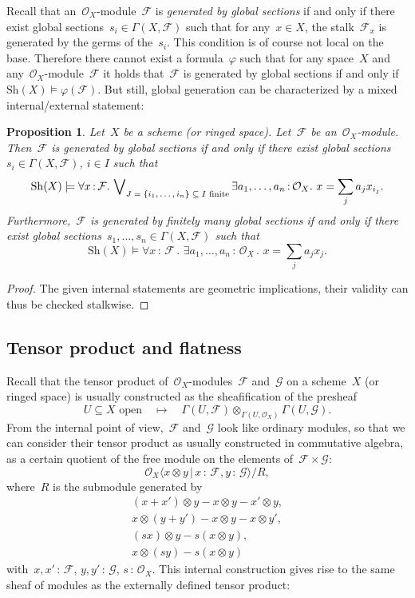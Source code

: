 \documentclass[10pt]{amsart}
\theoremstyle{definition}
\theoremstyle{plain}
\newtheorem{prop}[defn]{Proposition}
\theoremstyle{remark}
\newcommand{\F}{\mathcal{F}}
\renewcommand{\G}{\mathcal{G}}
\renewcommand{\O}{\mathcal{O}}
\newcommand{\Sh}{\mathrm{Sh}}
\newcommand{\?}{\,{:}\,}
\renewcommand{\_}{\mathpunct{.}\,}
\begin{document}
Recall that an~$\O_X$-module~$\F$ is \emph{generated by global sections} if and
only if there exist global sections~$s_i \in \Gamma(X,\F)$ such that for any~$x
\in X$, the stalk~$\F_x$ is generated by the germs of the~$s_i$.
This condition is of course not local on the base. Therefore there cannot
exist a formula~$\varphi$ such that for any space~$X$ and
any~$\O_X$-module~$\F$ it holds that~$\F$ is generated by global sections if
and only if~$\Sh(X) \models \varphi(\F)$. But still, global generation can be
characterized by a mixed internal/external statement:

\begin{prop}Let~$X$ be a scheme (or ringed space). Let~$\F$ be
an~$\O_X$-module. Then~$\F$ is generated by global sections if and only if
there exist global sections~$s_i \in \Gamma(X,\F)$, $i \in I$ such that
\[ \Sh(X) \models \forall x\?\F\_ \bigvee\nolimits_{\textnormal{$J=\{i_1,\ldots,i_n\} \subseteq I$ finite}}
  \exists a_1,\ldots,a_n\?\O_X\_
  x = \sum_j a_j x_{i_j}. \]
Furthermore,~$\F$ is generated by finitely many global sections if and only if
there exist global sections~$s_1,\ldots,s_n \in \Gamma(X,\F)$ such that
\[ \Sh(X) \models \forall x\?\F\_ \exists a_1,\ldots,a_n\?\O_X\_ x = \sum_j a_j
x_j. \]
\end{prop}
\begin{proof}The given internal statements are geometric implications, their
validity can thus be checked stalkwise.\end{proof}


\subsection{Tensor product and flatness} Recall that the tensor product
of~$\O_X$-modules~$\F$ and~$\G$ on a scheme~$X$ (or ringed space) is usually
constructed as the sheafification of the presheaf
\[ \text{$U \subseteq X$ open} \quad\longmapsto\quad \Gamma(U,\F) \otimes_{\Gamma(U,\O_X)}
\Gamma(U,\G). \]
From the internal point of view,~$\F$ and~$\G$ look like ordinary modules, so
that we can consider their tensor product as usually constructed in
commutative algebra, as a certain quotient of the free module on the elements
of~$\F \times \G$:
\[ \O_X\langle x \otimes y \,|\, x\?\F, y\?\G \rangle / R, \]
where~$R$ is the submodule generated by
\begin{gather*}
  (x+x') \otimes y - x \otimes y - x' \otimes y, \\
  x \otimes (y+y') - x \otimes y - x \otimes y', \\
  (sx) \otimes y - s(x \otimes y), \\
  x \otimes (sy) - s(x \otimes y)
\end{gather*}
with~$x,x'\?\F$, $y,y'\?\G$, $s\?\O_X$.
This internal construction gives rise to the same sheaf
of modules as the externally defined tensor product:
\end{document}
